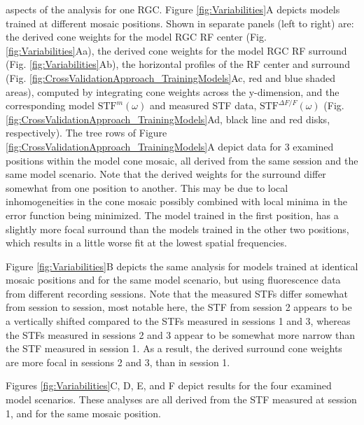 \documentclass[11pt, oneside]{article}   	%
\begin{document}
aspects of the analysis for one RGC. 
Figure \ref{fig:Variabilities}A depicts models trained at different mosaic positions. Shown in separate panels (left to right) are: the derived cone weights for the model RGC RF center (Fig. \ref{fig:Variabilities}Aa), the derived cone weights for the model RGC RF surround (Fig. \ref{fig:Variabilities}Ab), the horizontal profiles of the RF center and surround (Fig. \ref{fig:CrossValidationApproach_TrainingModels}Ac, red and blue shaded areas), computed by integrating cone weights across the y-dimension, and the corresponding model $\mbox{STF}^{m}(\omega)$ and measured STF data, $\mbox{STF}^{\Delta F / F}(\omega)$ (Fig. \ref{fig:CrossValidationApproach_TrainingModels}Ad, black line and red disks, respectively). The tree rows of Figure \ref{fig:CrossValidationApproach_TrainingModels}A depict data for 3 examined positions within the model cone mosaic, all derived from the same session and the same model scenario.
Note that the derived weights for the surround differ somewhat from one position to another. This may be due to local inhomogeneities in the cone mosaic possibly combined with local minima in the error function being minimized. The model trained in the first position, has a slightly more focal surround than the models trained in the other two positions, which results in a little worse fit at the lowest spatial frequencies.

Figure \ref{fig:Variabilities}B depicts the same analysis for models trained at identical mosaic positions and for the same model scenario, but using fluorescence data from different recording sessions. Note that the measured STFs differ somewhat from session to session, most notable here, the STF from session 2 appears to be a vertically shifted compared to the STFs measured in sessions 1 and 3, whereas the STFs measured in sessions 2 and 3 appear to be somewhat more narrow than the STF measured in session 1. As a result, the derived surround cone weights are more focal in sessions 2 and 3, than in session 1.

Figures \ref{fig:Variabilities}C, D, E, and F depict results for the four examined model scenarios. These analyses are all derived from the STF measured at session 1, and for the same mosaic position.
\end{document}
